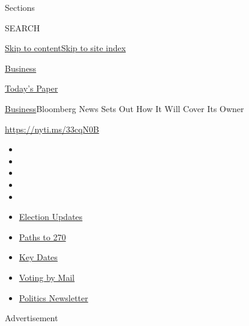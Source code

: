 Sections

SEARCH

\protect\hyperlink{site-content}{Skip to
content}\protect\hyperlink{site-index}{Skip to site index}

\href{https://www.nytimes3xbfgragh.onion/section/business}{Business}

\href{https://myaccount.nytimes3xbfgragh.onion/auth/login?response_type=cookie\&client_id=vi}{}

\href{https://www.nytimes3xbfgragh.onion/section/todayspaper}{Today's
Paper}

\href{/section/business}{Business}\textbar{}Bloomberg News Sets Out How
It Will Cover Its Owner

\url{https://nyti.ms/33cqN0B}

\begin{itemize}
\item
\item
\item
\item
\item
\end{itemize}

\begin{itemize}
\item
  \href{https://www.nytimes3xbfgragh.onion/live/2020/09/11/us/trump-vs-biden?action=click\&pgtype=Article\&state=default\&region=TOP_BANNER\&context=storylines_menu}{Election
  Updates}
\item
  \href{https://www.nytimes3xbfgragh.onion/interactive/2020/us/elections/election-states-biden-trump.html?action=click\&pgtype=Article\&state=default\&region=TOP_BANNER\&context=storylines_menu}{Paths
  to 270}
\item
  \href{https://www.nytimes3xbfgragh.onion/interactive/2019/us/elections/2020-presidential-election-calendar.html?action=click\&pgtype=Article\&state=default\&region=TOP_BANNER\&context=storylines_menu}{Key
  Dates}
\item
  \href{https://www.nytimes3xbfgragh.onion/interactive/2020/08/31/us/politics/vote-by-mail-deadlines.html?action=click\&pgtype=Article\&state=default\&region=TOP_BANNER\&context=storylines_menu}{Voting
  by Mail}
\item
  \href{https://www.nytimes3xbfgragh.onion/newsletters/politics?action=click\&pgtype=Article\&state=default\&region=TOP_BANNER\&context=storylines_menu}{Politics
  Newsletter}
\end{itemize}

Advertisement

